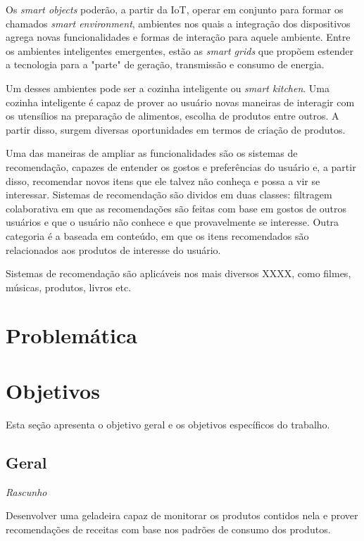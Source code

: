 
Os \textit{smart objects} poderão, a partir da IoT, operar em conjunto para formar os chamados \textit{smart environment}, ambientes nos quais a integração dos dispositivos agrega novas funcionalidades e formas de interação para aquele ambiente. Entre os ambientes inteligentes emergentes, estão as \textit{smart grids} que propõem estender a tecnologia para a "parte" de geração, transmissão e consumo de energia. 

Um desses ambientes pode ser a cozinha inteligente ou \textit{smart kitchen}. Uma cozinha inteligente é capaz de prover ao usuário novas maneiras de interagir com os utensílios na preparação de alimentos, escolha de produtos entre outros. A partir disso, surgem diversas oportunidades em termos de criação de produtos.

Uma das maneiras de ampliar as funcionalidades são os sistemas de recomendação, capazes de entender os gostos e preferências do usuário e, a partir disso, recomendar novos itens que ele talvez não conheça e possa a vir se interessar. Sistemas de recomendação são dividos em duas classes: filtragem colaborativa em que as recomendações são feitas com base em gostos de outros usuários e que o usuário não conhece e que provavelmente se interesse. Outra categoria é a baseada em conteúdo, em que os itens recomendados são relacionados aos produtos de interesse do usuário.

Sistemas de recomendação são aplicáveis nos mais diversos XXXX, como filmes, músicas, produtos, livros etc.

\section{Problemática}


\section{Objetivos}
Esta seção apresenta o objetivo geral e os objetivos específicos do trabalho.

\subsection{Geral}

\textit{Rascunho}

Desenvolver uma geladeira capaz de monitorar os produtos contidos nela e prover recomendações de receitas com base nos padrões de consumo dos produtos.

